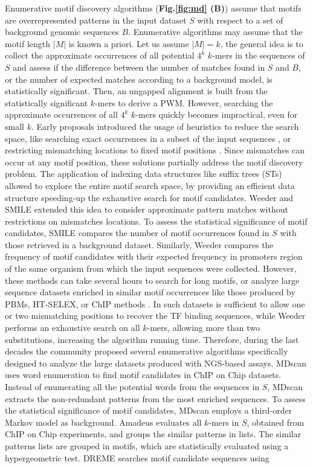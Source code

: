 \documentclass[a4paper, titlepage, openright]{book}
\begin{document}
Enumerative motif discovery algorithms (\textbf{Fig.\ref{fig:md} (B)}) assume that motifs are overrepresented patterns in the input dataset $S$ with respect to a set of background genomic sequences $B$. Enumerative algorithms may assume that the motif length $|M|$ is known a priori. Let us assume $|M|=k$, the general idea is to collect the approximate occurrences of all potential $4^{k}$ $k$-mers in the sequences of $S$ and assess if the difference between the number of matches found in $S$ and $B$, or the number of expected matches according to a background model, is statistically significant. Then, an ungapped alignment is built from the statistically significant $k$-mers to derive a PWM. However, searching the approximate occurrences of all $4^{k}$ $k$-mers quickly becomes impractical, even for small $k$. Early proposals introduced the usage of heuristics to reduce the search space, like searching exact occurrences in a subset of the input sequences \citep{li1999finding}, or restricting mismatching locations to fixed motif positions \citep{califano2000splash}. Since mismatches can occur at any motif position, these solutions partially address the motif discovery problem. The application of indexing data structures like suffix trees (STs) \citep{weiner1973linear} allowed to explore the entire motif search space, by providing an efficient data structure speeding-up the exhaustive search for motif candidates. Weeder \citep{pavesi2001algorithm,pavesi2004weeder} and SMILE \citep{marsan2000algorithms} extended this idea to consider approximate pattern matches without restrictions on mismatches locations. To assess the statistical significance of motif candidates, SMILE compares the number of motif occurrences found in $S$ with those retrieved in a background dataset. Similarly, Weeder compares the frequency of motif candidates with their expected frequency in promoters region of the same organism from which the input sequences were collected. However, these methods can take several hours to search for long motifs, or analyze large sequence datasets enriched in similar motif occurrences like those produced by PBMs, HT-SELEX, or ChIP methods \citep{liu2018algorithmic}. In such datasets is sufficient to allow one or two mismatching positions to recover the TF binding sequences, while Weeder performs an exhaustive search on all $k$-mers, allowing more than two substitutions, increasing the algorithm running time. Therefore, during the last decades the community proposed several enumerative algorithms specifically designed to analyze the large datasets produced with NGS-based assays. MDscan \citep{liu2002algorithm} uses word enumeration to find motif candidates in ChIP on Chip datasets. Instead of enumerating all the potential words from the sequences in $S$, MDscan extracts the non-redundant patterns from the most enriched sequences. To assess the statistical significance of motif candidates, MDscan employs a third-order Markov model as background. Amadeus \citep{linhart2008transcription} evaluates all $k$-mers in $S$, obtained from ChIP on Chip experiments, and groups the similar patterns in lists. The similar patterns lists are grouped in motifs, which are statistically evaluated using a hypergeometric test. DREME \citep{bailey2011dreme} searches motif candidate sequences using 
\end{document}
